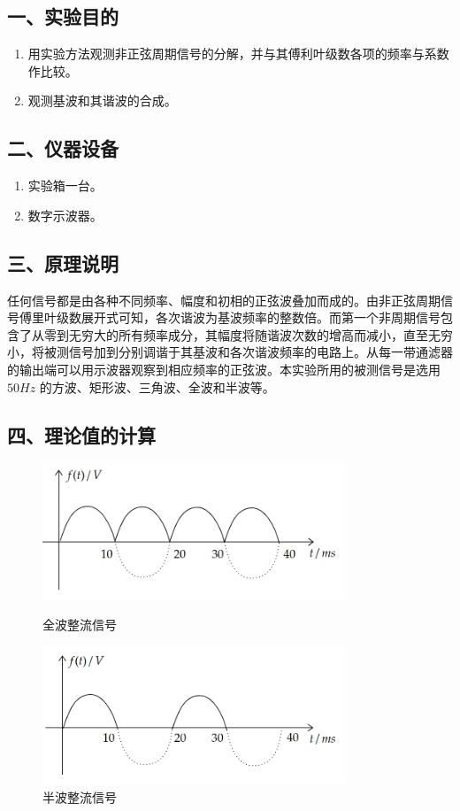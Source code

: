 \documentclass[dvipsnames, svgnames,a4paper,11pt]{article}
\begin{document}
\subsection*{一、实验目的}
\begin{enumerate}
  \item 用实验方法观测非正弦周期信号的分解，并与其傅利叶级数各项的频率与系数作比较。 
  \item 观测基波和其谐波的合成。
\end{enumerate}

\subsection*{二、仪器设备}
\begin{enumerate}
  \item 实验箱一台。
  \item 数字示波器。
\end{enumerate}

\subsection*{三、原理说明}
任何信号都是由各种不同频率、幅度和初相的正弦波叠加而成的。由非正弦周期信号傅里叶级数展开式可知，各次谐波为基波频率的整数倍。而第一个非周期信号包含了从零到无穷大的所有频率成分，其幅度将随谐波次数的增高而减小，直至无穷小，将被测信号加到分别调谐于其基波和各次谐波频率的电路上。从每一带通滤器的输出端可以用示波器观察到相应频率的正弦波。本实验所用的被测信号是选用 $50Hz$ 的方波、矩形波、三角波、全波和半波等。

\subsection*{四、理论值的计算}
\begin{figure}[htbp]
  \centering
  \begin{minipage}[t]{0.48\textwidth}
  \centering
  \includegraphics[width=9cm]{1.png}
  \caption{全波整流信号}
  \end{minipage}
  \begin{minipage}[t]{0.48\textwidth}
  \centering
  \includegraphics[width=9cm]{2.png}
  \caption{半波整流信号}
  \end{minipage}
\end{figure}
\end{document}
